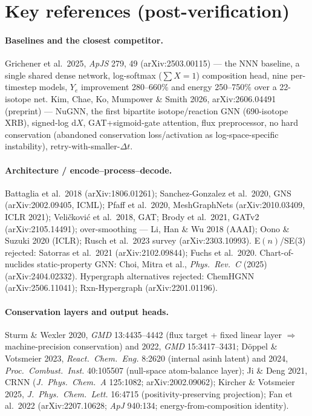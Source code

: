 \documentclass[11pt]{article}
\newcommand{\Ye}{Y_{e}}
\newcommand{\dd}{\mathrm{d}}
\begin{document}
\section*{Key references (post-verification)}

\paragraph{Baselines and the closest competitor.} Grichener et al.\ 2025, \emph{ApJS} 279, 49 (arXiv:2503.00115) --- the NNN baseline, a single shared dense network, log-softmax ($\sum X = 1$) composition head, nine per-timestep models, $\Ye$ improvement 280--660\% and energy 250--750\% over a 22-isotope net. Kim, Chae, Ko, Mumpower \& Smith 2026, arXiv:2606.04491 (preprint) --- NuGNN, the first bipartite isotope/reaction GNN (690-isotope XRB), signed-log $\dd X$, GAT+sigmoid-gate attention, flux preprocessor, no hard conservation (abandoned conservation loss/activation as log-space-specific instability), retry-with-smaller-$\Delta t$.

\paragraph{Architecture / encode--process--decode.} Battaglia et al.\ 2018 (arXiv:1806.01261); Sanchez-Gonzalez et al.\ 2020, GNS (arXiv:2002.09405, ICML); Pfaff et al.\ 2020, MeshGraphNets (arXiv:2010.03409, ICLR 2021); Veli\v{c}kovi\'c et al.\ 2018, GAT; Brody et al.\ 2021, GATv2 (arXiv:2105.14491); over-smoothing --- Li, Han \& Wu 2018 (AAAI); Oono \& Suzuki 2020 (ICLR); Rusch et al.\ 2023 survey (arXiv:2303.10993). E$(n)$/SE(3) rejected: Satorras et al.\ 2021 (arXiv:2102.09844); Fuchs et al.\ 2020. Chart-of-nuclides static-property GNN: Choi, Mitra et al., \emph{Phys.\ Rev.\ C} (2025) (arXiv:2404.02332). Hypergraph alternatives rejected: ChemHGNN (arXiv:2506.11041); Rxn-Hypergraph (arXiv:2201.01196).

\paragraph{Conservation layers and output heads.} Sturm \& Wexler 2020, \emph{GMD} 13:4435--4442 (flux target + fixed linear layer $\Rightarrow$ machine-precision conservation) and 2022, \emph{GMD} 15:3417--3431; D\"oppel \& Votsmeier 2023, \emph{React.\ Chem.\ Eng.} 8:2620 (internal asinh latent) and 2024, \emph{Proc.\ Combust.\ Inst.} 40:105507 (null-space atom-balance layer); Ji \& Deng 2021, CRNN (\emph{J.\ Phys.\ Chem.\ A} 125:1082; arXiv:2002.09062); Kircher \& Votsmeier 2025, \emph{J.\ Phys.\ Chem.\ Lett.} 16:4715 (positivity-preserving projection); Fan et al.\ 2022 (arXiv:2207.10628; \emph{ApJ} 940:134; energy-from-composition identity).
\end{document}
